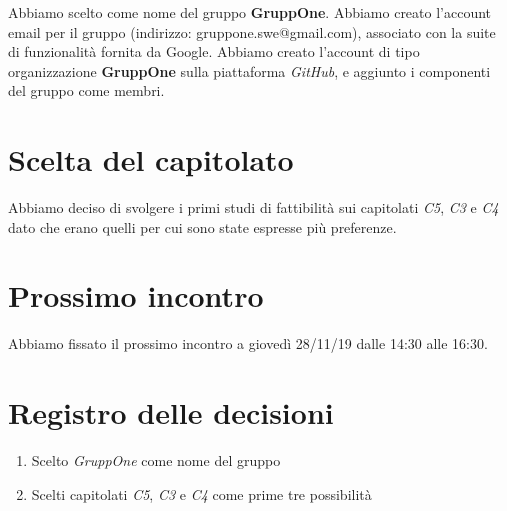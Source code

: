 \documentclass{article}
\begin{document}
Abbiamo scelto come nome del gruppo \textbf{GruppOne}.
Abbiamo creato l'account email per il gruppo (indirizzo: gruppone.swe@gmail.com), associato con la suite di funzionalità fornita da Google.
Abbiamo creato l'account di tipo organizzazione \textbf{GruppOne} sulla piattaforma \textit{GitHub}, e aggiunto i componenti del gruppo come membri.

\section{Scelta del capitolato}%
\label{sec:scelta_del_capitolato}
Abbiamo deciso di svolgere i primi studi di fattibilità sui capitolati \textit{C5}, \textit{C3} e \textit{C4} dato che erano quelli per cui sono state espresse più preferenze.

\section{Prossimo incontro}%
\label{sec:prossimo_incontro}

Abbiamo fissato il prossimo incontro a giovedì 28/11/19 dalle 14:30 alle 16:30.

\newpage
\section{Registro delle decisioni}%
\label{sec:registro_delle_decisioni}

\begin{enumerate}
  \item Scelto \textit{GruppOne} come nome del gruppo
  \item Scelti capitolati \textit{C5}, \textit{C3} e \textit{C4} come prime tre possibilità
\end{enumerate}

\end{document}

